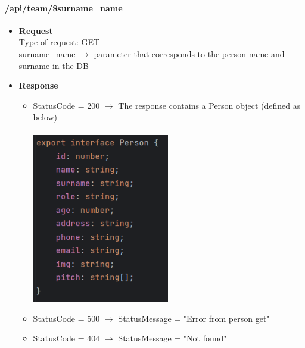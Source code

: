 \documentclass[11pt, letterpaper]{article}
\begin{document}
\paragraph{/api/team/\$surname\_name}
\begin{itemize}
    \item \textbf{Request} \\ Type of request: GET \\ surname\_name $\rightarrow$ parameter that corresponds to the person name and surname in the DB 
    \item \textbf{Response} \begin{itemize}
        \item StatusCode = 200 $\rightarrow$ The response contains  a Person object (defined as below) \\ \\
            \includegraphics[width=6cm]{images/API/Person.png}
        \item StatusCode = 500 $\rightarrow$ StatusMessage = "Error from person get"
        \item StatusCode = 404 $\rightarrow$ StatusMessage = "Not found"
    \end{itemize} 
\end{itemize}
\end{document}
